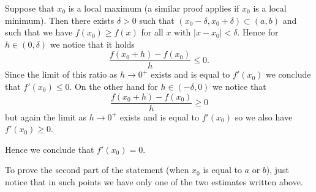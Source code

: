 \documentclass[12pt]{article}
\begin{document}
Suppose that $x_0$ is a local maximum (a similar proof applies if $x_0$ is a local minimum). Then there exists $\delta>0$ such that $(x_0-\delta,x_0+\delta)\subset (a,b)$ and such that we have $f(x_0)\ge f(x)$ 
for all $x$ with $\vert x-x_0\vert <\delta$. Hence for $h\in (0,\delta)$ we notice that it holds
\[
  \frac{f(x_0+h) - f(x_0)}{h} \le 0.
\]
Since the limit of this ratio as $h\to 0^+$ exists and is equal to $f'(x_0)$ we conclude that $f'(x_0)\le 0$. On the other hand for $h\in (-\delta,0)$ we notice that
\[
  \frac{f(x_0+h) - f(x_0)}{h} \ge 0
\]
but again the limit as $h\to 0^+$ exists and is equal to $f'(x_0)$ so we also have $f'(x_0)\ge 0$. 

Hence we conclude that $f'(x_0)=0$.

To prove the second part of the statement (when $x_0$ is equal to $a$ or $b$), just notice that in such
points we have only one of the two estimates written above.
\end{document}
